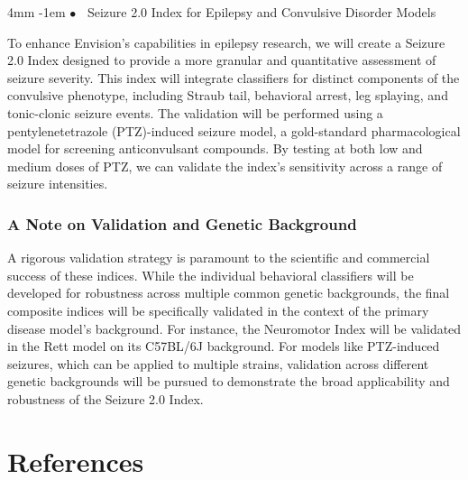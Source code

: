\documentclass[11pt,onecolumn]{article}
\makeatletter
\renewcommand\paragraph{%
  \@startsection{paragraph}{4}{\z@}%
    {4mm}%
    {-1em}%
    {\normalfont\normalsize\bfseries$\bullet$~}%
}
\makeatother
\begin{document}
\paragraph{Seizure 2.0 Index for Epilepsy and Convulsive Disorder Models}

To enhance Envision's capabilities in epilepsy research, we will create a Seizure 2.0 Index designed to provide a more granular and quantitative assessment of seizure severity. This index will integrate classifiers for distinct components of the convulsive phenotype, including Straub tail, behavioral arrest, leg splaying, and tonic-clonic seizure events. The validation will be performed using a pentylenetetrazole (PTZ)-induced seizure model, a gold-standard pharmacological model for screening anticonvulsant compounds. By testing at both low and medium doses of PTZ, we can validate the index's sensitivity across a range of seizure intensities.

\subsubsection{A Note on Validation and Genetic Background}

A rigorous validation strategy is paramount to the scientific and commercial success of these indices. While the individual behavioral classifiers will be developed for robustness across multiple common genetic backgrounds, the final composite indices will be specifically validated in the context of the primary disease model's background. For instance, the Neuromotor Index will be validated in the Rett model on its C57BL/6J background. For models like PTZ-induced seizures, which can be applied to multiple strains, validation across different genetic backgrounds will be pursued to demonstrate the broad applicability and robustness of the Seizure 2.0 Index.


\section{References}





\end{document}

